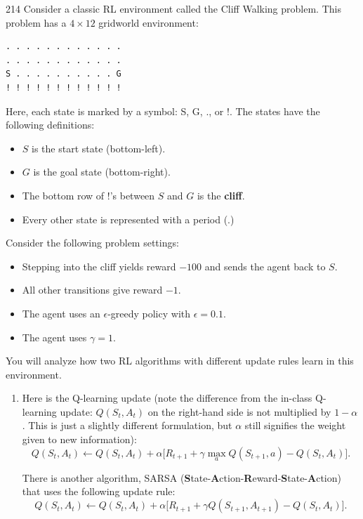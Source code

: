 \documentclass[11pt]{article}
\begin{document}
\begin{problem}{2}{14}
Consider a classic RL environment called the Cliff Walking problem. This problem has a $4 \times 12$ gridworld environment:

\begin{verbatim}
. . . . . . . . . . . .
. . . . . . . . . . . .
S . . . . . . . . . . G
! ! ! ! ! ! ! ! ! ! ! !
\end{verbatim}

Here, each state is marked by a symbol: S, G, ., or !. The states have the following definitions:

\begin{itemize}
    \item $S$ is the start state (bottom-left).
    \item $G$ is the goal state (bottom-right).
    \item The bottom row of !'s between $S$ and $G$ is the \textbf{cliff}.
    \item Every other state is represented with a period (.)
\end{itemize}

Consider the following problem settings:
\begin{itemize}
    \item Stepping into the cliff yields reward $-100$ and sends the agent back to $S$.
    \item All other transitions give reward $-1$.
    \item The agent uses an $\epsilon$-greedy policy with $\epsilon = 0.1$.
    \item The agent uses $\gamma = 1$.
\end{itemize}


You will analyze how two RL algorithms with different update rules learn in this environment.

\begin{enumerate}[label=(\alph*)]
\item Here is the Q-learning update (note the difference from the in-class Q-learning update: $Q(S_t, A_t)$ on the right-hand side is not multiplied by $1-\alpha$. This is just a slightly different formulation, but $\alpha$ still signifies the weight given to new information):
\[
Q(S_t, A_t) \leftarrow Q(S_t, A_t) + \alpha \Big[ R_{t+1} + \gamma \max_{a} Q(S_{t+1}, a) - Q(S_t, A_t) \Big].
\]

There is another algorithm, SARSA (\textbf{S}tate-\textbf{A}ction-\textbf{R}eward-\textbf{S}tate-\textbf{A}ction) that uses the following update rule:
\[
Q(S_t, A_t) \leftarrow Q(S_t, A_t) + \alpha \Big[ R_{t+1} + \gamma Q(S_{t+1}, A_{t+1}) - Q(S_t, A_t) \Big].
\]


\end{enumerate}
\end{problem}
\end{document}
